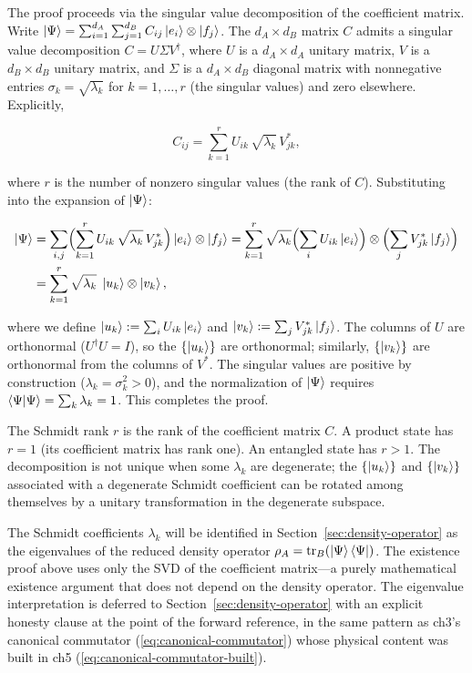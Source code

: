The proof proceeds via the singular value decomposition of the coefficient matrix. Write $\ket{\Psi} = \sum_{i=1}^{d_A}\sum_{j=1}^{d_B} C_{ij} \ket{e_i} \otimes \ket{f_j}$. The $d_A \times d_B$ matrix $C$ admits a singular value decomposition $C = U \Sigma V^\dagger$, where $U$ is a $d_A \times d_A$ unitary matrix, $V$ is a $d_B \times d_B$ unitary matrix, and $\Sigma$ is a $d_A \times d_B$ diagonal matrix with nonnegative entries $\sigma_k = \sqrt{\lambda_k}$ for $k = 1,\ldots,r$ (the singular values) and zero elsewhere. Explicitly,
\begin{linenomath}
\begin{equation}
C_{ij} = \sum_{k=1}^{r} U_{ik}\,\sqrt{\lambda_k}\,V_{jk}^{*},
\end{equation}
\end{linenomath}
where $r$ is the number of nonzero singular values (the rank of $C$). Substituting into the expansion of $\ket{\Psi}$:
\begin{linenomath}
\begin{align}
\ket{\Psi}
&= \sum_{i,j} \Bigl(\sum_{k=1}^{r} U_{ik}\,\sqrt{\lambda_k}\,V_{jk}^{*}\Bigr) \ket{e_i} \otimes \ket{f_j}
= \sum_{k=1}^{r} \sqrt{\lambda_k} \Bigl(\sum_i U_{ik}\ket{e_i}\Bigr) \otimes \Bigl(\sum_j V_{jk}^{*}\ket{f_j}\Bigr) \\
&= \sum_{k=1}^{r} \sqrt{\lambda_k}\; \ket{u_k} \otimes \ket{v_k},
\end{align}
\end{linenomath}
where we define $\ket{u_k} := \sum_i U_{ik}\ket{e_i}$ and $\ket{v_k} := \sum_j V_{jk}^{*}\ket{f_j}$. The columns of $U$ are orthonormal ($U^\dagger U = I$), so the $\{\ket{u_k}\}$ are orthonormal; similarly, $\{\ket{v_k}\}$ are orthonormal from the columns of $V^{*}$. The singular values are positive by construction ($\lambda_k = \sigma_k^2 > 0$), and the normalization of $\ket{\Psi}$ requires $\braket{\Psi|\Psi} = \sum_k \lambda_k = 1$. This completes the proof.

The Schmidt rank $r$ is the rank of the coefficient matrix $C$. A product state has $r = 1$ (its coefficient matrix has rank one). An entangled state has $r > 1$. The decomposition is not unique when some $\lambda_k$ are degenerate; the $\{\ket{u_k}\}$ and $\{\ket{v_k}\}$ associated with a degenerate Schmidt coefficient can be rotated among themselves by a unitary transformation in the degenerate subspace.

\begin{note}
The Schmidt coefficients $\lambda_k$ will be identified in Section~\ref{sec:density-operator} as the eigenvalues of the reduced density operator $\rho_A = \mathrm{tr}_B(\ket{\Psi}\bra{\Psi})$. The existence proof above uses only the SVD of the coefficient matrix---a purely mathematical existence argument that does not depend on the density operator. The eigenvalue interpretation is deferred to Section~\ref{sec:density-operator} with an explicit honesty clause at the point of the forward reference, in the same pattern as ch3's canonical commutator (\eqref{eq:canonical-commutator}) whose physical content was built in ch5 (\eqref{eq:canonical-commutator-built}).
\end{note}

